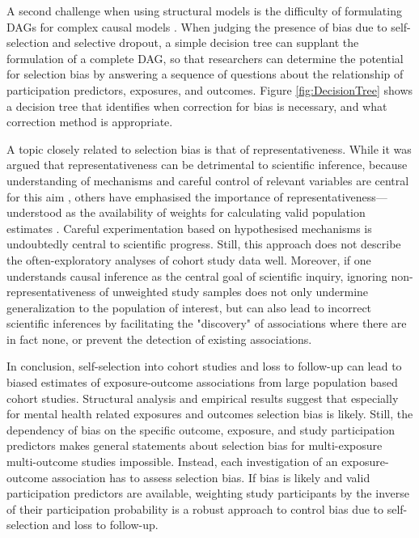 \documentclass[12pt]{article}
\begin{document}
A second challenge when using structural models is the difficulty of formulating DAGs for complex causal models \cite{Shrier2008-vr}. When judging the presence of bias due to self-selection and selective dropout, a simple decision tree can supplant the formulation of a complete DAG, so that researchers can determine the potential for selection bias by answering a sequence of questions about the relationship of participation predictors, exposures, and outcomes. Figure \ref{fig:DecisionTree} shows a decision tree that identifies when correction for bias is necessary, and what correction method is appropriate.

A topic closely related to selection bias is that of representativeness. While it was argued that representativeness can be detrimental to scientific inference, because understanding of mechanisms and careful control of relevant variables are central for this aim \cite{Rothman2013-qc}, others have emphasised the importance of representativeness---understood as the availability of weights for calculating valid population estimates \cite{Keiding2016-fv}. Careful experimentation based on hypothesised mechanisms is undoubtedly central to scientific progress. Still, this approach does not describe the often-exploratory analyses of cohort study data well. Moreover, if one understands causal inference as the central goal of scientific inquiry, ignoring non-representativeness of unweighted study samples does not only undermine generalization to the population of interest, but can also lead to incorrect scientific inferences by facilitating the "discovery" of associations where there are in fact none, or prevent the detection of existing associations.

In conclusion, self-selection into cohort studies and loss to follow-up can lead to biased estimates of exposure-outcome associations from large population based cohort studies. Structural analysis and empirical results suggest that especially for mental health related exposures and outcomes selection bias is likely. Still, the dependency of bias on the specific outcome, exposure, and study participation predictors makes general statements about selection bias for multi-exposure multi-outcome studies impossible. Instead, each  investigation of an exposure-outcome association has to assess selection bias. If bias is likely and valid participation predictors are available, weighting study participants by the inverse of their participation probability is a robust approach to control bias due to self-selection and loss to follow-up.
\end{document}
